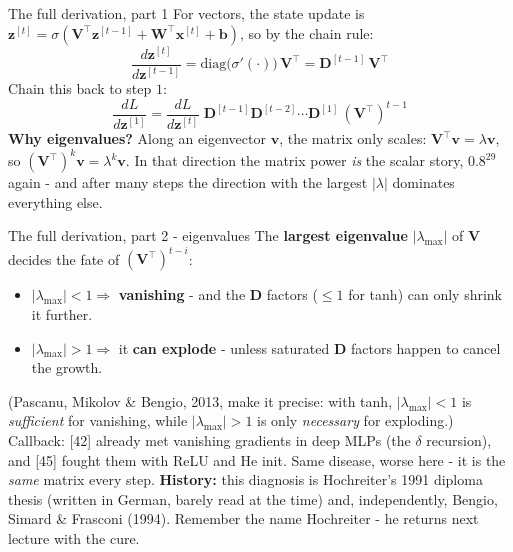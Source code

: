 \documentclass[aspectratio=169]{beamer}
\begin{document}
\begin{frame}{The full derivation, part 1}
  For vectors, the state update is
  $\mathbf{z}^{[t]} = \sigma(\mathbf{V}^\top\mathbf{z}^{[t-1]}+\mathbf{W}^\top\mathbf{x}^{[t]}+\mathbf{b})$,
  so by the chain rule:
  \[
    \frac{d\mathbf{z}^{[t]}}{d\mathbf{z}^{[t-1]}}
      = \text{diag}\big(\sigma'(\cdot)\big)\,\mathbf{V}^\top
      = \mathbf{D}^{[t-1]}\,\mathbf{V}^\top
  \]
  Chain this back to step $1$:
  \[
    \frac{dL}{d\mathbf{z}^{[1]}} = \frac{dL}{d\mathbf{z}^{[t]}}\;
      \mathbf{D}^{[t-1]}\mathbf{D}^{[t-2]}\cdots\mathbf{D}^{[1]}\,(\mathbf{V}^\top)^{t-1}
  \]
  \vskip 8pt
  \vskip 6pt
  {\small \textbf{Why eigenvalues?} Along an eigenvector $\mathbf{v}$, the matrix only
  scales: $\mathbf{V}^\top\mathbf{v} = \lambda\mathbf{v}$, so
  $(\mathbf{V}^\top)^{k}\mathbf{v} = \lambda^{k}\mathbf{v}$. In that direction the matrix
  power \emph{is} the scalar story, $0.8^{29}$ again - and after many steps the direction
  with the largest $|\lambda|$ dominates everything else.}
\end{frame}

\begin{frame}{The full derivation, part 2 - eigenvalues}
  The \textbf{largest eigenvalue} $|\lambda_{\max}|$ of $\mathbf{V}$ decides the fate of
  $(\mathbf{V}^\top)^{t-i}$:
  \begin{itemize}
    \item $|\lambda_{\max}| < 1 \Rightarrow$ \textbf{vanishing} - and the $\mathbf{D}$
      factors ($\le 1$ for tanh) can only shrink it further.
    \item $|\lambda_{\max}| > 1 \Rightarrow$ it \textbf{can explode} - unless saturated
      $\mathbf{D}$ factors happen to cancel the growth.
  \end{itemize}
  {\footnotesize (Pascanu, Mikolov \& Bengio, 2013, make it precise: with tanh,
  $|\lambda_{\max}| < 1$ is \emph{sufficient} for vanishing, while $|\lambda_{\max}| > 1$
  is only \emph{necessary} for exploding.)}
  \vskip 6pt
  \vskip 6pt
  {\footnotesize Callback: [42] already met vanishing gradients in deep MLPs (the
  $\delta$ recursion), and [45] fought them with ReLU and He init. Same disease, worse
  here - it is the \emph{same} matrix every step.}
  \vskip 4pt
  {\footnotesize \textbf{History:} this diagnosis is Hochreiter's 1991 diploma thesis
  (written in German, barely read at the time) and, independently, Bengio, Simard \&
  Frasconi (1994). Remember the name Hochreiter - he returns next lecture with the
  cure.}
\end{frame}
\end{document}
